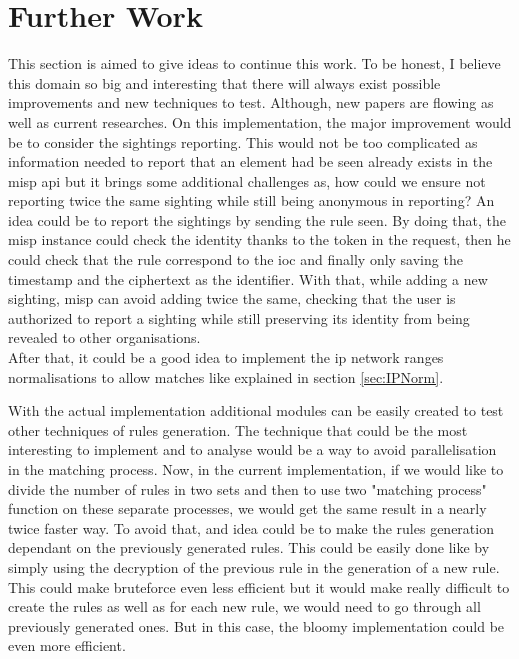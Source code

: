 \documentclass{eplmastersthesis}
\begin{document}
\section{Further Work}
This section is aimed to give ideas to continue this work. To be honest, I believe this domain so big and interesting that there will always exist possible improvements and new techniques to test. Although, new papers are flowing as well as current researches.
On this implementation, the major improvement would be to consider the sightings reporting. This would not be too complicated as information needed to report that an element had be seen already exists in the \gls{misp} \gls{api} but it brings some additional challenges as, how could we ensure not reporting twice the same sighting while still being anonymous in reporting?
An idea could be to report the sightings by sending the rule seen. By doing that, the \gls{misp} instance could check the identity thanks to the token in the request, then he could check that the rule correspond to the \gls{ioc} and finally only saving the timestamp and the ciphertext as the identifier.
With that, while adding a new sighting, \gls{misp} can avoid adding twice the same, checking that the user is authorized to report a sighting while still preserving its identity from being revealed to other organisations.\\

After that, it could be a good idea to implement the \gls{ip} network ranges normalisations to allow matches like explained in section \ref{sec:IPNorm}.

With the actual implementation additional modules can be easily created to test other techniques of rules generation. The technique that could be the most interesting to implement and to analyse would be a way to avoid parallelisation in the matching process.
Now, in the current implementation, if we would like to divide the number of rules in two sets and then to use two "matching process" function on these separate processes, we would get the same result in a nearly twice faster way. To avoid that, and idea could be to make the rules generation dependant on the previously generated rules. This could be easily done like by simply using the decryption of the previous rule in the generation of a new rule.
This could make bruteforce even less efficient but it would make really difficult to create the rules as well as for each new rule, we would need to go through all previously generated ones.
But in this case, the bloomy implementation could be even more efficient.\\
\end{document}
